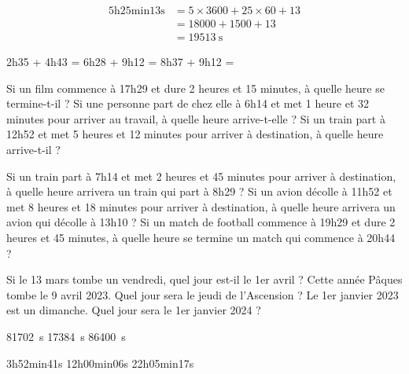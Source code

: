 \documentclass[../Cours.tex]{subfiles}
\begin{document}

\begin{align*}
    \mbox{5h25min13s} &= 5 \times 3600 + 25 \times 60 + 13 \\
    &= 18000 + 1500 + 13\\
    &= \qty{19513}{\second}
\end{align*}

\clearpage
\EXERCICES 
\begin{questions}
    \question 2h35 + 4h43 = 
    \question 6h28 + 9h12 = 
    \question 8h37 + 9h12 = 
    
    \question Si un film commence à 17h29 et dure 2 heures et 15 minutes, à quelle heure se termine-t-il ?
    \question Si une personne part de chez elle à 6h14 et met 1 heure et 32 minutes pour arriver au travail, à quelle heure arrive-t-elle ?
    \question Si un train part à 12h52 et met 5 heures et 12 minutes pour arriver à destination, à quelle heure arrive-t-il ?
    
    \question Si un train part à 7h14 et met 2 heures et 45 minutes pour arriver à destination, à quelle heure arrivera un train qui part à 8h29 ?
    \question Si un avion décolle à 11h52 et met 8 heures et 18 minutes pour arriver à destination, à quelle heure arrivera un avion qui décolle à 13h10 ?
    \question Si un match de football commence à 19h29 et dure 2 heures et 45 minutes, à quelle heure se termine un match qui commence à 20h44 ?

    \question Si le 13 mars tombe un vendredi, quel jour est-il le 1er avril ?
    \question Cette année Pâques tombe le 9 avril 2023. Quel jour sera le jeudi de l'Ascension ?
    \question Le 1er janvier 2023 est un dimanche. Quel jour sera le 1er janvier 2024 ?

    \question \qty{81702}{\second}
    \question \qty{17384}{\second}
    \question \qty{86400}{\second}

    \question 3h52min41s
    \question 12h00min06s
    \question 22h05min17s

    
\end{questions}
\end{document}
